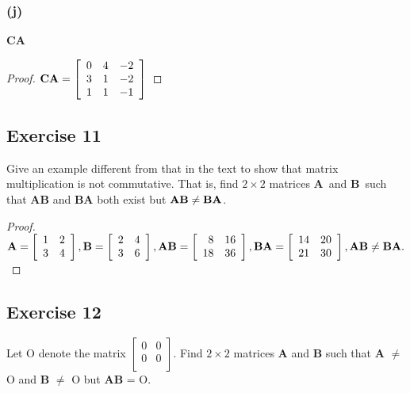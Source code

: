 \documentclass[14pt]{extarticle}
\begin{document}
\subsubsection{(j)}
{\bf CA}
\begin{proof}
\({\bf CA} = 
\left[ 
\begin{array}{rrr}
0 & 4 & -2 \\
3 & 1 & -2\\
1 & 1 & -1 \\
\end{array}
\right]
\)
\end{proof}

\subsection{Exercise 11}
Give an example different from that in the text to show that matrix multiplication is not commutative. That is, find 
\(2 \times 2\) matrices {\bf A}\, and {\bf B}\, such that {\bf AB} and {\bf BA} both exist but \({\bf AB} \neq {\bf BA}\).

\begin{proof}
\({\bf A} = 
\left[ 
\begin{array}{rr}
1 & 2 \\
3 & 4 \\
\end{array}
\right], {\bf B} = 
\left[ 
\begin{array}{rr}
2 & 4 \\
3 & 6 \\
\end{array}
\right], {\bf AB} = 
\left[ 
\begin{array}{rr}
8 & 16 \\
18 & 36 \\
\end{array}
\right], {\bf BA} = 
\left[ 
\begin{array}{rr}
14 & 20 \\
21 & 30 \\
\end{array}
\right], {\bf AB} \neq {\bf BA}.
\)
\end{proof}

\subsection{Exercise 12}
Let O denote the matrix 
\(\left[ 
\begin{array}{rr}
0 & 0 \\
0 & 0 \\
\end{array}
\right]
\). Find \(2 \times 2\) matrices {\bf A} and {\bf B} such that {\bf A} \(\neq\) O and {\bf B} \(\neq\) O but {\bf AB} = O.
\end{document}
